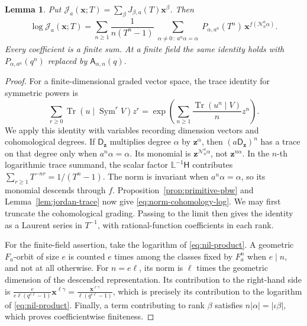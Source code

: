 \documentclass[11pt, reqno]{amsart}
\numberwithin{equation}{section}
\newtheorem{lemma}[theorem]{Lemma}
\theoremstyle{definition}
\theoremstyle{remark}
\newcommand{\op}[1]{\operatorname{#1}}
\newcommand{\mb}[1]{\mathbb{#1}}
\newcommand{\mc}[1]{\mathcal{#1}}
\newcommand{\Tr}{\op{Tr}}
\begin{document}
\begin{lemma}\label{lem:norm-log}
Put $\mc J_a(\mathbf x;T)=\sum_\beta J_{\beta,a}(T)\mathbf x^\beta$.
Then
\begin{equation}\label{eq:norm-cohomology-log} \log\mc J_a(\mathbf x;T)= \sum_{n\geq1}\frac{1}{n(T^n-1)} \sum_{\substack{\alpha\ne0\,:\ a^n\alpha=\alpha}} P_{\alpha,a^n}(T^n)\, \mathbf x^{f(\mc N_n^a\alpha)}.\end{equation}
Every coefficient is a finite sum. At a finite field the same identity
holds with $P_{\alpha,a^n}(q^n)$ replaced by $\mathsf A_{\alpha,n}(q)$.
\end{lemma}
\begin{proof}
For a finite-dimensional graded vector space, the trace identity for
symmetric powers is
\[ \sum_{r\ge0}\Tr(u\mid\op{Sym}^r V)z^r =\exp\left(\sum_{n\ge1}\frac{\Tr(u^n\mid V)}n z^n\right). \]
We apply this identity with variables recording dimension vectors and
cohomological degrees. If $\mathsf D_{\mathbf z}$ multiplies degree
$\alpha$ by $\mathbf z^\alpha$, then $(a\mathsf D_{\mathbf z})^n$ has a
trace on that degree only when $a^n\alpha=\alpha$. Its monomial is
$\mathbf z^{\mc N_n^a\alpha}$, not $\mathbf z^{n\alpha}$.
In the $n$-th logarithmic trace summand, the scalar factor
$\mb L^{-1}\mathsf H$ contributes
$\sum_{r\geq1}T^{-nr}=1/(T^n-1)$. The norm is invariant
when $a^n\alpha=\alpha$, so its monomial descends through $f$.
Proposition~\ref{prop:primitive-pbw} and
Lemma~\ref{lem:jordan-trace} now give
\eqref{eq:norm-cohomology-log}. We may first truncate the cohomological grading. Passing to the limit
then gives the identity as a Laurent series in $T^{-1}$, with
rational-function coefficients in each rank.

For the finite-field assertion, take the logarithm of
\eqref{eq:nil-product}. A geometric $F_a$-orbit of size $e$ is counted
$e$ times among the classes fixed by $F_a^n$ when $e\mid n$, and not
at all otherwise. For $n=e\ell$, its norm is $\ell$ times the
geometric dimension of the descended representation. Its contribution to the right-hand side is
$\frac{e}{e\ell(q^{e\ell}-1)}\mathbf x^{\ell\gamma} =\frac{\mathbf x^{\ell\gamma}} {\ell(q^{e\ell}-1)}$,
which is precisely its contribution to the logarithm of
\eqref{eq:nil-product}. Finally, a term contributing to rank $\beta$
satisfies $n|\alpha|=|\iota\beta|$, which proves coefficientwise
finiteness.
\end{proof}
\end{document}
